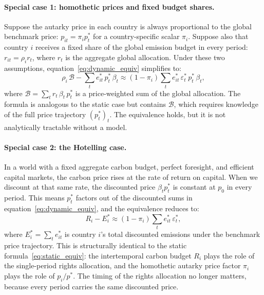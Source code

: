 \documentclass[12pt,english]{article}
\begin{document}
\paragraph{Special case 1: homothetic prices and fixed budget shares.} Suppose the autarky price in each country is always proportional to the global benchmark price: $p_{it} = \pi_i p^*_t$ for a country-specific scalar $\pi_i$. Suppose also that country $i$ receives a fixed share of the global emission budget in every period: $r_{it} = \rho_i r_t$, where $r_t$ is the aggregate global allocation. Under these two assumptions, equation~\eqref{eq:dynamic_equiv} simplifies to:
\begin{equation}
    \rho_i\,\mathscr{B} - \sum_t e^*_{it}\,p^*_t\,\beta_t
    \approx
    (1 - \pi_i)\sum_t e^*_{it}\,\varepsilon^*_t\,p^*_t\,\beta_t,
    \label{eq:homothetic}
\end{equation}
where $\mathscr{B} = \sum_t r_t\,\beta_t\,p^*_t$ is a price-weighted sum of the global allocation. The formula is analogous to the static case but contains $\mathscr{B}$, which requires knowledge of the full price trajectory $(p^*_t)_t$. The equivalence holds, but it is not analytically tractable without a model.

\paragraph{Special case 2: the Hotelling case.} In a world with a fixed aggregate carbon budget, perfect foresight, and efficient capital markets, the carbon price rises at the rate of return on capital. When we discount at that same rate, the discounted price $\beta_t p^*_t$ is constant at $p_0$ in every period. This means $p^*_t$ factors out of the discounted sums in equation~\eqref{eq:dynamic_equiv}, and the equivalence reduces to:
\begin{equation}
    \boxed{R_i - E^*_i \approx (1 - \pi_i)\sum_t e^*_{it}\,\varepsilon^*_t,}
    \label{eq:hotelling_equiv}
\end{equation}
where $E^*_i = \sum_t e^*_{it}$ is country $i$'s total discounted emissions under the benchmark price trajectory. This is structurally identical to the static formula~\eqref{eq:static_equiv}: the intertemporal carbon budget $R_i$ plays the role of the single-period rights allocation, and the homothetic autarky price factor $\pi_i$ plays the role of $p_i/p^*$. The timing of the rights allocation no longer matters, because every period carries the same discounted price.
\end{document}
